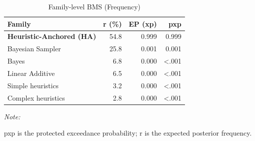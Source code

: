 \begin{table}[!h]
\centering
\caption{Family-level BMS (Frequency)}
\centering
\begin{threeparttable}
\begin{tabular}[t]{lrrr}
\toprule
Family & r (\%) & EP (xp) & pxp\\
\midrule
\textbf{Heuristic-Anchored (HA)} & 54.8 & 0.999 & 0.999\\
Bayesian Sampler & 25.8 & 0.001 & 0.001\\
Bayes & 6.8 & 0.000 & <.001\\
Linear Additive & 6.5 & 0.000 & <.001\\
Simple heuristics & 3.2 & 0.000 & <.001\\
Complex heuristics & 2.8 & 0.000 & <.001\\
\bottomrule
\end{tabular}
\begin{tablenotes}
\item \textit{Note: } 
\item pxp is the protected exceedance probability; r is the expected posterior frequency.
\end{tablenotes}
\end{threeparttable}
\end{table}
